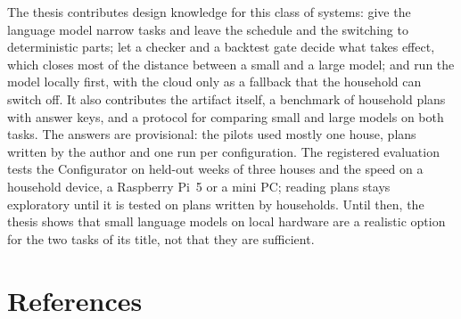 \documentclass[12pt,a4paper]{report}
\begin{document}
The thesis contributes design knowledge for this class of systems:
give the language model narrow tasks and leave the schedule and the
switching to deterministic parts; let a checker and a backtest gate
decide what takes effect, which closes most of the distance between a
small and a large model; and run the model locally first, with the
cloud only as a fallback that the household can switch off. It also
contributes the artifact itself, a benchmark of household plans with
answer keys, and a protocol for comparing small and large models on
both tasks. The answers are provisional: the pilots used mostly one house,
plans written by the author and one run per configuration. The
registered evaluation tests the Configurator on held-out weeks of three
houses and the speed on a household device, a Raspberry Pi~5 or a mini
PC; reading plans stays exploratory until it is tested on plans written
by households. Until then, the thesis shows that small language models on local hardware are
a realistic option for the two tasks of its title, not that they are
sufficient.

\chapter*{References}
\end{document}
